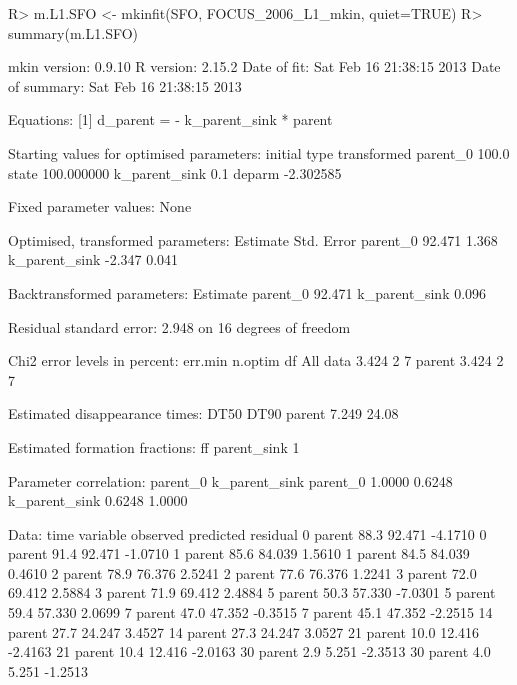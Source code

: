 \documentclass[12pt,a4paper]{article}
\begin{document}
\begin{Schunk}
\begin{Sinput}
R> m.L1.SFO <- mkinfit(SFO, FOCUS_2006_L1_mkin, quiet=TRUE)
R> summary(m.L1.SFO)
\end{Sinput}
\begin{Soutput}
mkin version:    0.9.10 
R version:       2.15.2 
Date of fit:     Sat Feb 16 21:38:15 2013 
Date of summary: Sat Feb 16 21:38:15 2013 

Equations:
[1] d_parent = - k_parent_sink * parent

Starting values for optimised parameters:
              initial   type transformed
parent_0        100.0  state  100.000000
k_parent_sink     0.1 deparm   -2.302585

Fixed parameter values:
None

Optimised, transformed parameters:
              Estimate Std. Error
parent_0        92.471      1.368
k_parent_sink   -2.347      0.041

Backtransformed parameters:
              Estimate
parent_0        92.471
k_parent_sink    0.096

Residual standard error: 2.948 on 16 degrees of freedom

Chi2 error levels in percent:
         err.min n.optim df
All data   3.424       2  7
parent     3.424       2  7

Estimated disappearance times:
        DT50  DT90
parent 7.249 24.08

Estimated formation fractions:
            ff
parent_sink  1

Parameter correlation:
              parent_0 k_parent_sink
parent_0        1.0000        0.6248
k_parent_sink   0.6248        1.0000

Data:
 time variable observed predicted residual
    0   parent     88.3    92.471  -4.1710
    0   parent     91.4    92.471  -1.0710
    1   parent     85.6    84.039   1.5610
    1   parent     84.5    84.039   0.4610
    2   parent     78.9    76.376   2.5241
    2   parent     77.6    76.376   1.2241
    3   parent     72.0    69.412   2.5884
    3   parent     71.9    69.412   2.4884
    5   parent     50.3    57.330  -7.0301
    5   parent     59.4    57.330   2.0699
    7   parent     47.0    47.352  -0.3515
    7   parent     45.1    47.352  -2.2515
   14   parent     27.7    24.247   3.4527
   14   parent     27.3    24.247   3.0527
   21   parent     10.0    12.416  -2.4163
   21   parent     10.4    12.416  -2.0163
   30   parent      2.9     5.251  -2.3513
   30   parent      4.0     5.251  -1.2513
\end{Soutput}
\end{Schunk}
\end{document}
